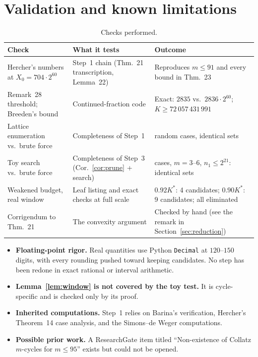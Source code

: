 \documentclass[11pt]{amsart}
\theoremstyle{definition}
\theoremstyle{remark}
\newcommand{\Kst}{K^{*}}
\begin{document}
\section{Validation and known limitations}\label{sec:validation}

\begin{table}[H]
\centering
\small
\begin{tabular}{@{}>{\raggedright\arraybackslash}p{4.4cm}>{\raggedright\arraybackslash}p{4.3cm}>{\raggedright\arraybackslash}p{5.2cm}@{}}
\toprule
Check & What it tests & Outcome \\
\midrule
Hercher's numbers at $X_0 = 704\cdot 2^{60}$ & Step~1 chain (Thm.~21 transcription, Lemma~22) & Reproduces $m \le 91$ and every bound in Thm.~23 \\
Remark~28 threshold; Breeden's bound & Continued-fraction code & Exact: $2835$ vs.\ $2836\cdot 2^{60}$; $K \ge 72\,057\,431\,991$ \\
Lattice enumeration vs.\ brute force & Completeness of Step~1 & 40 random cases, identical sets \\
Toy search vs.\ brute force & Completeness of Step~3 (Cor.~\ref{cor:prune} + search) & 6 cases, $m = 3$--$6$, $n_1 \le 2^{21}$: identical sets \\
Weakened budget, real window & Leaf listing and exact checks at full scale & $0.92\Kst$: 4 candidates; $0.90\Kst$: 9 candidates; all eliminated \\
Corrigendum to Thm.~21 & The convexity argument & Checked by hand (see the remark in Section~\ref{sec:reduction}) \\
\bottomrule
\end{tabular}
\caption{Checks performed.}
\end{table}

\begin{itemize}
  \item \textbf{Floating-point rigor.} Real quantities use Python \texttt{Decimal} at $120$--$150$
  digits, with every rounding pushed toward keeping candidates. No step has been redone in exact
  rational or interval arithmetic.
  \item \textbf{Lemma~\ref{lem:window} is not covered by the toy test.} It is cycle-specific and
  is checked only by its proof.
  \item \textbf{Inherited computations.} Step~1 relies on Barina's verification, Hercher's
  Theorem~14 case analysis, and the Simons--de Weger computations.
  \item \textbf{Possible prior work.} A ResearchGate item titled ``Non-existence of Collatz
  $m$-cycles for $m \le 95$'' exists but could not be opened.
\end{itemize}
\end{document}
